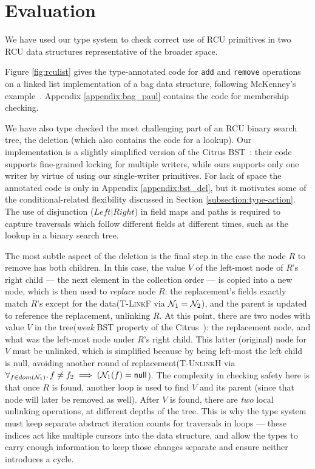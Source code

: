 \makeatletter %
\def\arcr{\@arraycr}
\makeatother
\section{Evaluation}
\label{sec:eval}
We have used our type system to check correct use of RCU primitives in two RCU data structures representative of the broader space.

Figure \ref{fig:rculist} gives the type-annotated code for \lstinline|add| and \lstinline|remove| operations on a linked list implementation of a bag data structure, following McKenney's example~\cite{McKenney2015SomeEO}.
Appendix \ref{appendix:bag_paul} contains the code for membership checking.

We have also type checked the most challenging part of an RCU binary search tree, the deletion (which also contains the code for a lookup).
Our implementation is a slightly simplified version of the Citrus BST~\cite{Arbel:2014:CUR:2611462.2611471}: their code supports fine-grained locking for multiple writers, while ours supports only one writer by virtue of using our single-writer primitives.
For lack of space the annotated code is only in Appendix \ref{appendix:bst_del}, but it motivates some of the conditional-related flexibility discussed in Section \ref{subsection:type-action}.
The use of disjunction ($Left|Right$) in field maps and paths is required to capture traversals which follow different fields at different times, such as the lookup in a binary search tree.

The most subtle aspect of the deletion is the final step in the case the node $R$ to remove has both children.  In this case, the value $V$ of the left-most node of $R$'s right child --- the next element in the collection order --- is copied into a new node, which is then used to \emph{replace} node $R$: the replacement's fields exactly match $R$'s except for the data(\textsc{T-LinkF} via $\mathcal{N}_1 = \mathcal{N}_2$), and the parent is updated to reference the replacement, unlinking $R$.  At this point, there are two nodes with value $V$ in the tree(\textit{weak} BST property of the Citrus~\cite{Arbel:2014:CUR:2611462.2611471}): the replacement node, and what was the left-most node under $R$'s right child. This latter (original) node for $V$ must be unlinked, which is simplified because by being left-most the left child is null, avoiding another round of replacement(\textsc{T-UnlinkH} via $\forall_{f\in dom(\mathcal{N}_1)} \ldotp f\neq f_2 \implies (\mathcal{N}_1(f) = \textsf{null}$).
The complexity in checking safety here is that once $R$ is found, another loop is used to find $V$ and its parent (since that node will later be removed as well).
After $V$ is found, there are \emph{two} local unlinking operations, at different depths of the tree.  This is why the type system must keep separate abstract iteration counts for traversals in loops --- these indices act like multiple cursors into the data structure, and allow the types to carry enough information to keep those changes separate and ensure neither introduces a cycle.

